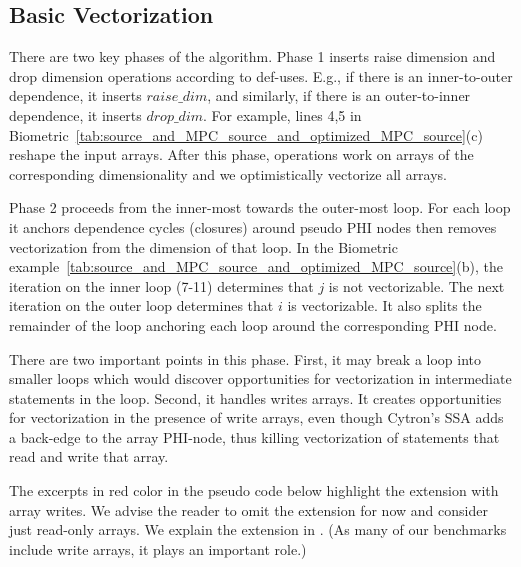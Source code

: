 \subsection{Basic Vectorization}
\label{sec:basic_vectorization}


There are two key phases of the algorithm. Phase 1 inserts raise dimension and drop dimension 
operations according to def-uses. E.g., if there is an inner-to-outer dependence, it inserts $\mathit{raise\_dim}$,
and similarly, if there is an outer-to-inner dependence, it inserts $\mathit{drop\_dim}$. 
For example, lines 4,5 in Biometric~\ref{tab:source_and_MPC_source_and_optimized_MPC_source}(c) reshape the input arrays. 
After this phase, operations work on arrays of the corresponding dimensionality and we optimistically vectorize all arrays. 

Phase 2 proceeds from the inner-most towards the outer-most loop. For each loop it anchors dependence cycles (closures) 
around pseudo PHI nodes then removes vectorization from the dimension of that loop. In the 
Biometric example~\ref{tab:source_and_MPC_source_and_optimized_MPC_source}(b), the iteration on the inner loop (7-11)
determines that $j$ is not vectorizable. The next iteration on the outer loop determines that $i$ is vectorizable. It also 
splits the remainder of the loop anchoring each loop around the corresponding PHI node. 

There are two important points in this 
phase. First, it may break a loop into smaller loops which would discover opportunities 
for vectorization in intermediate statements in the loop. Second, it handles writes arrays. 
It creates opportunities for vectorization in the presence of write arrays, even though 
Cytron's SSA adds a back-edge to the array PHI-node, thus killing vectorization of statements
that read and write that array.

The excerpts in {\color{red} red} color in the pseudo code below highlight the extension 
with array writes. We advise the reader to omit the extension for now and consider just read-only
arrays. We explain the extension in . 
(As many of our benchmarks include write arrays, it plays an important role.)


